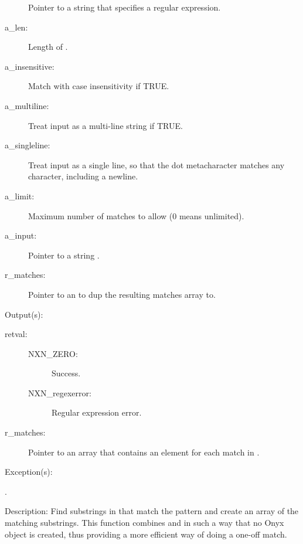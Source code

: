 \begin{capi}
\begin{capilist}
\begin{description}
			Pointer to a string that specifies a regular expression.
		\item[a\_len: ]
			Length of .
		\item[a\_insensitive: ]
			Match with case insensitivity if TRUE.
		\item[a\_multiline: ]
			Treat input as a multi-line string if TRUE.
		\item[a\_singleline: ]
			Treat input as a single line, so that the dot
			metacharacter matches any character, including a
			newline.
		\item[a\_limit: ]
			Maximum number of matches to allow (0 means unlimited).
		\item[a\_input: ]
			Pointer to a string .
		\item[r\_matches: ]
			Pointer to an  to dup the resulting
			matches array to.
		\end{description}
	\item[Output(s): ]
		\begin{description}\item[]
		\item[retval: ]
			\begin{description}\item[]
			\item[NXN\_ZERO: ] Success.
			\item[NXN\_regexerror: ] Regular expression error.
			\end{description}
		\item[r\_matches: ]
			Pointer to an array  that contains an
			element for each match in .
		\end{description}
	\item[Exception(s): ]
		\begin{description}\item[]
		\item[.]
		\end{description}
	\item[Description: ]
		Find substrings in  that match the pattern and
		create an array of the matching substrings.  This function
		combines  and
		 in such a way that no Onyx object is
		created, thus providing a more efficient way of doing a one-off
		match.
	\end{capilist}
\end{capi}
